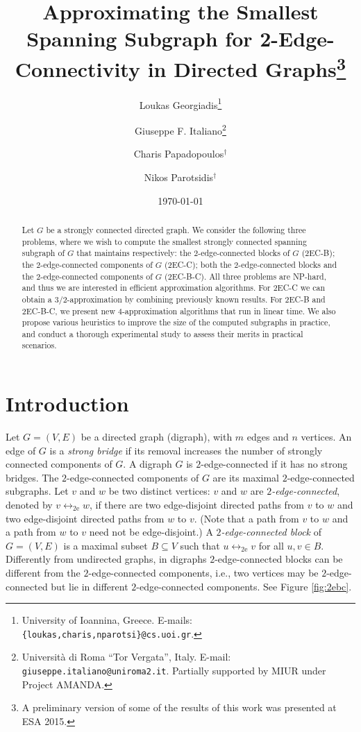 \documentclass[11pt]{article}
\begin{document}
\title{\bf Approximating the Smallest Spanning Subgraph for 2-Edge-Connectivity in Directed Graphs\thanks{
A preliminary version of some of the results of this work was presented at ESA 2015.}}
\author{
Loukas Georgiadis\thanks{
University of Ioannina, Greece. E-mails: \texttt{\{loukas,charis,nparotsi\}@cs.uoi.gr}.}
\and
Giuseppe F. Italiano\thanks{
Universit\`a di Roma ``Tor Vergata'', Italy. E-mail: \texttt{giuseppe.italiano@uniroma2.it}.
Partially supported by MIUR
under Project AMANDA.
}
\and
Charis Papadopoulos$^\dagger$
\and
Nikos Parotsidis$^\dagger$
}

\date{\today}

\maketitle

\begin{abstract}
Let $G$ be a strongly connected directed graph. We consider the following three problems, where we wish to compute the smallest strongly connected spanning subgraph of $G$ that maintains respectively: the $2$-edge-connected blocks of $G$ (\textsf{2EC-B});
the $2$-edge-connected components of $G$ (\textsf{2EC-C});
both the $2$-edge-connected blocks and the $2$-edge-connected components of $G$ (\textsf{2EC-B-C}). All three problems are NP-hard, and thus we are interested in efficient approximation algorithms.
For \textsf{2EC-C} we can obtain a $3/2$-approximation by combining previously known results.
For \textsf{2EC-B} and \textsf{2EC-B-C}, we present new $4$-approximation algorithms that run in linear time.
We also propose various heuristics to improve the size of the computed subgraphs in practice, and conduct a thorough experimental study to assess their merits in practical scenarios.
\end{abstract}

\section{Introduction}
\label{sec:introduction}

Let $G=(V,E)$ be a directed graph (digraph), with $m$ edges and $n$ vertices.
An edge of $G$ is a \emph{strong bridge} if its removal increases the number of strongly connected components of $G$.
A digraph $G$ is $2$-edge-connected if it has no strong bridges. The $2$-edge-connected components of $G$ are its maximal $2$-edge-connected subgraphs.
Let $v$ and $w$ be two distinct vertices: $v$ and $w$ are \emph{$2$-edge-connected}, denoted by  $v \leftrightarrow_{\mathrm{2e}} w$, if there are two edge-disjoint directed paths from $v$ to $w$  and two edge-disjoint directed paths from $w$ to $v$. (Note that a path from $v$ to $w$ and a path from $w$ to $v$ need not be edge-disjoint.)
A \emph{$2$-edge-connected block} of $G=(V,E)$ is a maximal subset $B \subseteq V$ such that $u \leftrightarrow_{\mathrm{2e}} v$ for all $u, v \in B$.
Differently from undirected graphs, in digraphs $2$-edge-connected blocks can be different from the  $2$-edge-connected components, i.e., two vertices may be $2$-edge-connected but lie in different $2$-edge-connected components. See Figure \ref{fig:2ebc}.
\end{document}
